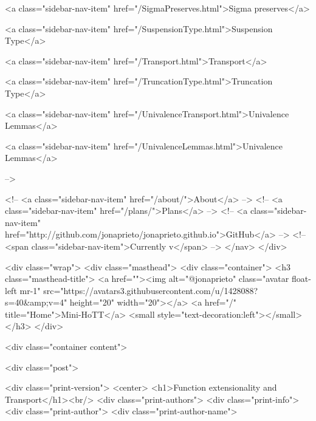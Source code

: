       
        
          <a class="sidebar-nav-item" href="/SigmaPreserves.html">Sigma preserves</a>
        
      
    
      
        
          <a class="sidebar-nav-item" href="/SuspensionType.html">Suspension Type</a>
        
      
    
      
        
          <a class="sidebar-nav-item" href="/Transport.html">Transport</a>
        
      
    
      
        
          <a class="sidebar-nav-item" href="/TruncationType.html">Truncation Type</a>
        
      
    
      
        
          <a class="sidebar-nav-item" href="/UnivalenceTransport.html">Univalence Lemmas</a>
        
      
    
      
        
          <a class="sidebar-nav-item" href="/UnivalenceLemmas.html">Univalence Lemmas</a>
        
      
     -->

    <!-- <a class="sidebar-nav-item" href="/about/">About</a> -->
    <!-- <a class="sidebar-nav-item" href="/plans/">Plans</a> -->
    <!-- <a class="sidebar-nav-item" href="http://github.com/jonaprieto/jonaprieto.github.io">GitHub</a> -->
    <!-- <span class="sidebar-nav-item">Currently v</span> -->
  </nav>
</div>

    <div class="wrap">
      <div class="masthead">
        <div class="container">
          <h3 class="masthead-title">
            <a href=""><img alt="@jonaprieto" class="avatar float-left mr-1" src="https://avatars3.githubusercontent.com/u/1428088?s=40&amp;v=4" height="20" width="20"></a>
            <a href="/" title="Home">Mini-HoTT</a>
            <small style="text-decoration:left"></small>
          </h3>
        </div>
      
      <div class="container content">
        







<div class="post">

  <div class="print-version">
    <center>
      <h1>Function extensionality and Transport</h1><br/>
        <div class="print-authors">
          <div class="print-info">
            <div class="print-author">
              <div class="print-author-name">
                
